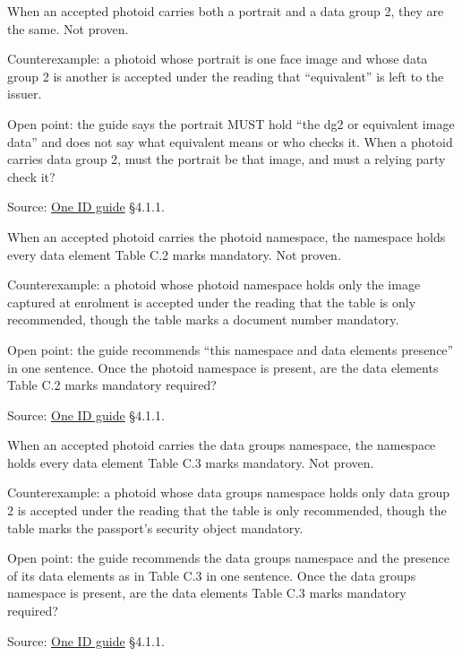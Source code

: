 \begin{theorem}
  \label{thm:portrait-is-dg2}
  When an accepted photoid carries both a portrait and a data group 2, they
  are the same.  Not proven.

  Counterexample: a photoid whose portrait is one face image and whose data
  group 2 is another is accepted under the reading that ``equivalent'' is
  left to the issuer.

  Open point: the guide says the portrait MUST hold ``the dg2 or equivalent
  image data'' and does not say what equivalent means or who checks it.  When
  a photoid carries data group 2, must the portrait be that image, and must a
  relying party check it?

  Source: \href{https://standards.atlassian.net/wiki/spaces/OneID/pages/2947416082/Technical+Implementation+Guide}{One ID guide} §4.1.1.
\end{theorem}

\begin{theorem}
  \label{thm:photoid-namespace-complete}
  When an accepted photoid carries the photoid namespace, the namespace holds
  every data element Table C.2 marks mandatory.  Not proven.

  Counterexample: a photoid whose photoid namespace holds only the image
  captured at enrolment is accepted under the reading that the table is only
  recommended, though the table marks a document number mandatory.

  Open point: the guide recommends ``this namespace and data elements
  presence'' in one sentence.  Once the photoid namespace is present, are the
  data elements Table C.2 marks mandatory required?

  Source: \href{https://standards.atlassian.net/wiki/spaces/OneID/pages/2947416082/Technical+Implementation+Guide}{One ID guide} §4.1.1.
\end{theorem}

\begin{theorem}
  \label{thm:datagroups-namespace-complete}
  When an accepted photoid carries the data groups namespace, the namespace
  holds every data element Table C.3 marks mandatory.  Not proven.

  Counterexample: a photoid whose data groups namespace holds only data group
  2 is accepted under the reading that the table is only recommended, though
  the table marks the passport's security object mandatory.

  Open point: the guide recommends the data groups namespace and the presence
  of its data elements as in Table C.3 in one sentence.  Once the data groups
  namespace is present, are the data elements Table C.3 marks mandatory
  required?

  Source: \href{https://standards.atlassian.net/wiki/spaces/OneID/pages/2947416082/Technical+Implementation+Guide}{One ID guide} §4.1.1.
\end{theorem}

